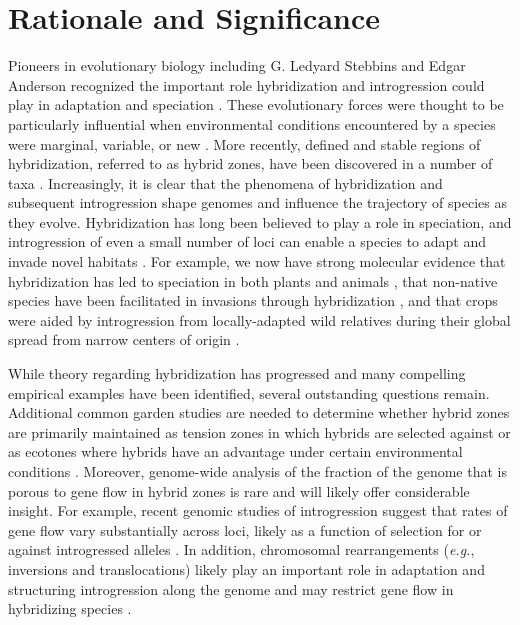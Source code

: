 \section*{Rationale and Significance}
Pioneers in evolutionary biology including G. Ledyard Stebbins and Edgar Anderson recognized the important role hybridization and introgression could play in adaptation and speciation \citep{Anderson1948, Anderson1954}. These evolutionary forces were thought to be particularly influential when environmental conditions encountered by a species were marginal, variable, or new \citep{Stebbins1959}. More recently, defined and stable regions of hybridization, referred to as hybrid zones, have been discovered in a number of taxa \citep[reviewed in ][]{HarrisonHybridZone, shurtliff2013, abbott2014}. Increasingly, it is clear that the phenomena of hybridization and subsequent introgression shape genomes and influence the trajectory of species as they evolve. Hybridization has long been believed to play a role in speciation, and introgression of even a small number of loci can enable a species to adapt and invade novel habitats \citep{currat2008, abbott2013}.  For example, we now have strong molecular evidence that hybridization has led to speciation in both plants and animals \citep[reviewed in][]{mallet2007}, that non-native species have been facilitated in invasions through hybridization \citep[\emph{e.g.}, the expansion of sticklebacks in Switzerland:][]{lucek2010}, and that crops were aided by introgression from locally-adapted wild relatives during their global spread from narrow centers of origin \citep{he2011, Hufford2013}.

While theory regarding hybridization has progressed and many compelling empirical examples have been identified, several outstanding questions remain. 
Additional common garden studies are needed to determine whether hybrid zones are primarily maintained as tension zones in which hybrids are selected against or as ecotones where hybrids have an advantage under certain environmental conditions \citep{Kruuk1999, Rasmussen2012, Smith2013b}. 
Moreover, genome-wide analysis of the fraction of the genome that is porous to gene flow in hybrid zones is rare and will likely offer considerable insight.  
For example, recent genomic studies of introgression suggest that rates of gene flow vary substantially across loci, likely as a function of selection for or against introgressed alleles \citep{Hufford2013, Poelstra2014}.  
In addition, chromosomal rearrangements (\emph{e.g.}, inversions and translocations) likely play an important role in adaptation and structuring introgression along the genome and may restrict gene flow in hybridizing species \citep{guerrero2012, Barb2014, guerrero2014}.

